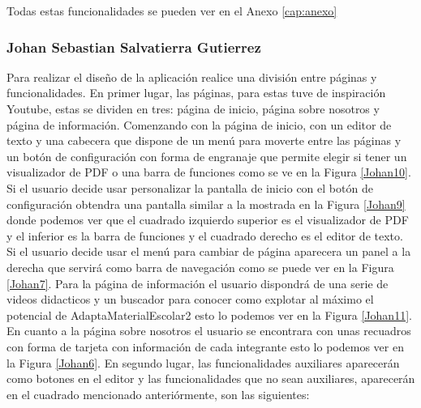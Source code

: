 Todas estas funcionalidades se pueden ver en el Anexo \ref{cap:anexo}

\subsubsection{Johan Sebastian Salvatierra Gutierrez}
Para realizar el diseño de la aplicación realice una división entre páginas y funcionalidades. 
En primer lugar, las páginas, para estas tuve de inspiración Youtube, estas se dividen en tres: página de inicio, página sobre nosotros y página de información. Comenzando con la página de inicio, con un editor de texto y una cabecera que dispone de un menú para moverte entre las páginas y un botón de configuración con forma de engranaje que permite elegir si tener un visualizador de PDF o una barra de funciones como se ve en la Figura \ref{Johan10}. Si el usuario decide usar personalizar la pantalla de inicio con el botón de configuración obtendra una pantalla similar a la mostrada en la Figura \ref{Johan9} donde podemos ver que el cuadrado izquierdo superior es el visualizador de PDF y el inferior es la barra de funciones y el cuadrado derecho es el editor de texto. Si el usuario decide usar el menú para cambiar de página aparecera un panel a la derecha que servirá como barra de navegación como se puede ver en la Figura \ref{Johan7}. Para la página de información el usuario dispondrá de una serie de videos didacticos y un buscador para conocer como explotar al máximo el potencial de AdaptaMaterialEscolar2 esto lo podemos ver en la Figura \ref{Johan11}. En cuanto a la página sobre nosotros el usuario se encontrara con unas recuadros con forma de tarjeta con información de cada integrante esto lo podemos ver en la Figura \ref{Johan6}.
En segundo lugar, las funcionalidades auxiliares aparecerán  como botones en el editor y las funcionalidades que no sean auxiliares, aparecerán en el cuadrado mencionado anteriórmente, son las siguientes:
